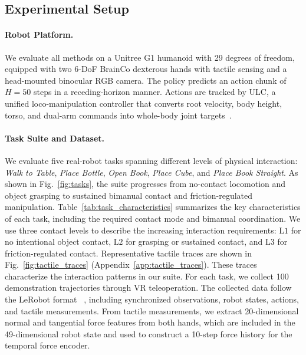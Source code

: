 \documentclass{article} %
\begin{document}
\subsection{Experimental Setup}
\label{sec:experimental_setup}

\paragraph{Robot Platform.}
We evaluate all methods on a Unitree G1 humanoid with 29 degrees of freedom, equipped with two 6-DoF BrainCo dexterous hands with tactile sensing and a head-mounted binocular RGB camera. The policy predicts an action chunk of $H=50$ steps in a receding-horizon manner. Actions are tracked by ULC, a unified loco-manipulation controller that converts root velocity, body height, torso, and dual-arm commands into whole-body joint targets~\cite{sun2025ulc}.



\paragraph{Task Suite and Dataset.}
We evaluate five real-robot tasks spanning different levels of physical interaction: \textit{Walk to Table}, \textit{Place Bottle}, \textit{Open Book}, \textit{Place Cube}, and \textit{Place Book Straight}. As shown in Fig.~\ref{fig:tasks}, the suite progresses from no-contact locomotion and object grasping to sustained bimanual contact and friction-regulated manipulation.
Table~\ref{tab:task_characteristics} summarizes the key characteristics of each task, including the required contact mode and bimanual coordination. We use three contact levels to describe the increasing interaction requirements: $\mathrm{L1}$ for no intentional object contact, $\mathrm{L2}$ for grasping or sustained contact, and $\mathrm{L3}$ for friction-regulated contact.
Representative tactile traces are shown in Fig.~\ref{fig:tactile_traces} (Appendix~\ref{app:tactile_traces}). These traces characterize the interaction patterns in our suite. 
For each task, we collect 100 demonstration trajectories through
VR teleoperation. The collected data follow the LeRobot format
~\cite{cadene2024lerobot}, including synchronized observations, robot states,
actions, and tactile measurements. From tactile measurements, we extract 20-dimensional normal and tangential force features from both hands, which are included in the 49-dimensional robot state and used to construct a 10-step force history for the temporal force encoder.
\end{document}
